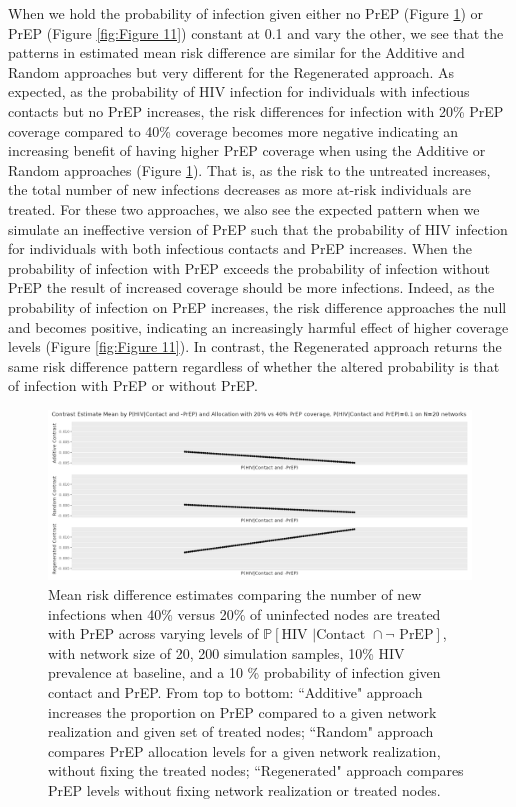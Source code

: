 \documentclass{article}
\theoremstyle{definition}
\begin{document}
When we hold the probability of infection given either no PrEP (Figure \ref{fig:Figure 10}) or PrEP (Figure \ref{fig:Figure 11}) constant at 0.1 and vary the other, we see that the patterns in estimated mean risk difference are similar for the Additive and Random approaches but very different for the Regenerated approach. As expected, as the probability of HIV infection for individuals with infectious contacts but no PrEP increases, the risk differences for infection with 20\% PrEP coverage compared to 40\% coverage becomes more negative indicating an increasing benefit of having higher PrEP coverage when using the Additive or Random approaches (Figure \ref{fig:Figure 10}). That is, as the risk to the untreated increases, the total number of new infections decreases as more at-risk individuals are treated. For these two approaches, we also see the expected pattern when we simulate an ineffective version of PrEP such that the probability of HIV infection for individuals with both infectious contacts and PrEP increases. When the probability of infection with PrEP exceeds the probability of infection without PrEP the result of increased coverage should be more infections. Indeed, as the probability of infection on PrEP increases, the risk difference approaches the null and becomes positive, indicating an increasingly harmful effect of higher coverage levels (Figure \ref{fig:Figure 11}). In contrast, the Regenerated approach returns the same risk difference pattern regardless of whether the altered probability is that of infection with PrEP or without PrEP.


\begin{figure}[H]
    \centering
    \includegraphics[width=\linewidth]{Corrected Figures/p1 Mean plots.png}
    \caption{Mean risk difference estimates comparing the number of new infections when 40\% versus 20\% of uninfected nodes are treated with PrEP across varying levels of  $\mathbb{P}\left[\text{HIV } \vert \text {Contact } \cap \neg \text{ PrEP}\right]$, with network size of 20,  200 simulation samples,  10\% HIV prevalence at baseline, and a 10 \% probability of infection given contact and PrEP.
    From top to bottom: ``Additive" approach increases the proportion on PrEP compared to a given network realization and given set of treated nodes; ``Random" approach compares PrEP allocation levels for a given network realization, without fixing the treated nodes; ``Regenerated" approach compares PrEP levels without fixing network realization or treated nodes.}
    \label{fig:Figure 10}
\end{figure}
\end{document}

